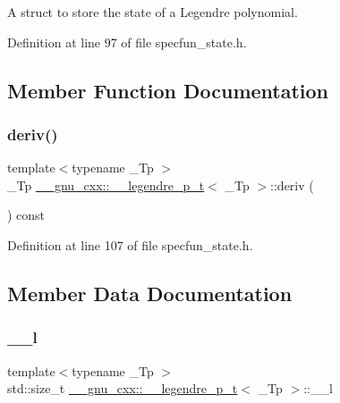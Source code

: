 A struct to store the state of a Legendre polynomial. 

Definition at line 97 of file specfun\+\_\+state.\+h.



\subsection{Member Function Documentation}
\mbox{\label{struct____gnu__cxx_1_1____legendre__p__t_a91e1b4e4049e5085b52342db2afbad9d}} 
\subsubsection{\texorpdfstring{deriv()}{deriv()}}
{\footnotesize\ttfamily template$<$typename \+\_\+\+Tp $>$ \\
\+\_\+\+Tp \hyperlink{struct____gnu__cxx_1_1____legendre__p__t}{\+\_\+\+\_\+gnu\+\_\+cxx\+::\+\_\+\+\_\+legendre\+\_\+p\+\_\+t}$<$ \+\_\+\+Tp $>$\+::deriv (\begin{DoxyParamCaption}{ }\end{DoxyParamCaption}) const\hspace{0.3cm}{\ttfamily [inline]}}



Definition at line 107 of file specfun\+\_\+state.\+h.



\subsection{Member Data Documentation}
\mbox{\label{struct____gnu__cxx_1_1____legendre__p__t_a1dc68f604d546cb75e4009a7da9cc152}} 
\subsubsection{\texorpdfstring{\+\_\+\+\_\+l}{\_\_l}}
{\footnotesize\ttfamily template$<$typename \+\_\+\+Tp $>$ \\
std\+::size\+\_\+t \hyperlink{struct____gnu__cxx_1_1____legendre__p__t}{\+\_\+\+\_\+gnu\+\_\+cxx\+::\+\_\+\+\_\+legendre\+\_\+p\+\_\+t}$<$ \+\_\+\+Tp $>$\+::\+\_\+\+\_\+l}



